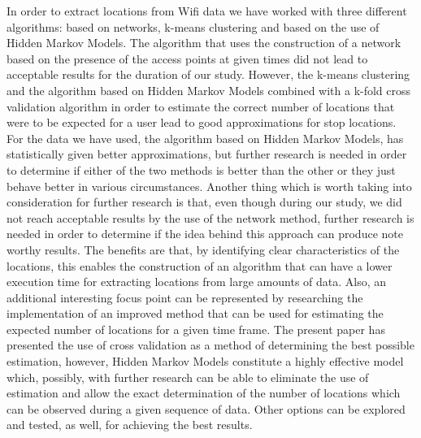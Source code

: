 In order to extract locations from Wifi data we have worked with three different
algorithms: based on networks, k-means clustering and based on the use of Hidden
Markov Models. The algorithm that uses the construction of a network based on
the presence of the access points at given times did not lead to acceptable
results for the duration of our study. However, the k-means clustering and the
algorithm based on Hidden Markov Models combined with a k-fold cross validation
algorithm in order to estimate the correct number of locations that were to be
expected for a user lead to good approximations for stop locations. For the data
we have used, the algorithm based on Hidden Markov Models, has statistically
given better approximations, but further research is needed in order to
determine if either of the two methods is better than the other or they just
behave better in various circumstances. Another thing which is worth taking into
consideration for further research is that, even though during our study, we did
not reach acceptable results by the use of the network method, further research
is needed in order to determine if the idea behind this approach can produce
note worthy results. The benefits are that, by identifying clear characteristics
of the locations, this enables the construction of an algorithm that can have a
lower execution time for extracting locations from large amounts of data. Also,
an additional interesting focus point can be represented by researching the
implementation of an improved method that can be used for estimating the
expected number of locations for a given time frame. The present paper has
presented the use of cross validation as a method of determining the best
possible estimation, however, Hidden Markov Models constitute a highly effective
model which, possibly, with further research can be able to eliminate the use of
estimation and allow the exact determination of the number of locations which
can be observed during a given sequence of data.
Other options can be explored and tested, as well, for achieving the best
results.

